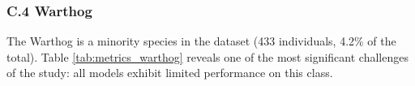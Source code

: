 \begin{table}[ht]
\centering
\caption{Performance metrics for the Kob species (Phase 2).}
\label{tab:metrics_kob}
\end{table}


\subsubsection*{C.4 Warthog}

The Warthog is a minority species in the dataset (433 individuals, 4.2\% of the total). Table \ref{tab:metrics_warthog} reveals one of the most significant challenges of the study: all models exhibit limited performance on this class.

